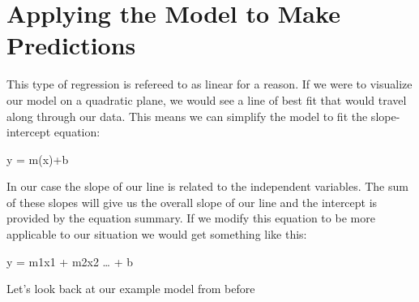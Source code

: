 \documentclass[
]{book}
\begin{document}
\hypertarget{applying-the-model-to-make-predictions}{%
\section{Applying the Model to Make Predictions}\label{applying-the-model-to-make-predictions}}

This type of regression is refereed to as linear for a reason. If we were to visualize our model on a quadratic plane, we would see a line of best fit that would travel along through our data. This means we can simplify the model to fit the slope-intercept equation:

y = m(x)+b

In our case the slope of our line is related to the independent variables. The sum of these slopes will give us the overall slope of our line and the intercept is provided by the equation summary. If we modify this equation to be more applicable to our situation we would get something like this:

y = m1x1 + m2x2 \ldots{} + b

Let's look back at our example model from before
\end{document}
